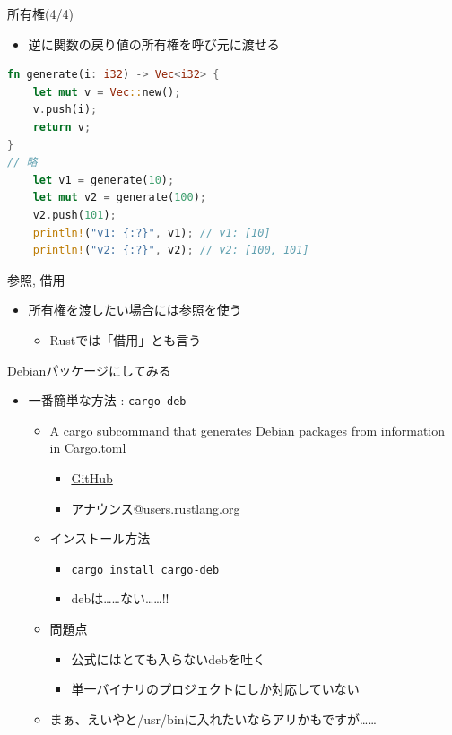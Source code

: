\documentclass[cjk,dvipdfmx,10pt,compress,fragile%
hyperref={bookmarks=true,bookmarksnumbered=true,bookmarksopen=false,%
colorlinks=false,%
pdftitle={第 134 回 関西 Debian 勉強会},%
pdfauthor={小林},%
pdfsubject={資料},%
}]{beamer}
\begin{document}
\begin{frame}[t,fragile]{所有権(4/4)}
\begin{itemize}
 \item 逆に関数の戻り値の所有権を呼び元に渡せる
\end{itemize}
 \begin{lstlisting}[language=Rust,style=boxed,style=colouredRust]
fn generate(i: i32) -> Vec<i32> {
    let mut v = Vec::new();
    v.push(i);
    return v;
}
// 略
    let v1 = generate(10);
    let mut v2 = generate(100);
    v2.push(101);
    println!("v1: {:?}", v1); // v1: [10]
    println!("v2: {:?}", v2); // v2: [100, 101]\end{lstlisting}
\end{frame}

\begin{frame}[t,fragile]{参照, 借用}
 \begin{itemize}
  \item 所有権を渡したい場合には参照を使う
	\begin{itemize}
	 \item Rustでは「借用」とも言う
	\end{itemize}
 \end{itemize}
\end{frame}


\begin{frame}[t,fragile]{Debianパッケージにしてみる}
 \begin{itemize}
  \item 一番簡単な方法 : \texttt{cargo-deb}
	\begin{itemize}
	 \item A cargo subcommand that generates Debian packages from information in Cargo.toml
	       \begin{itemize}
		\item \href{https://github.com/mmstick/cargo-deb}{GitHub}
		\item \href{https://users.rust-lang.org/t/cargo-deb-make-debian-packages-from-cargo-projects/12199}{アナウンス@users.rustlang.org}
	       \end{itemize}
	 \item インストール方法
	       \begin{itemize}
		\item \verb|cargo install cargo-deb|
		\item debは……ない……!!
	       \end{itemize}
	 \item 問題点
	       \begin{itemize}
		\item 公式にはとても入らないdebを吐く
		\item 単一バイナリのプロジェクトにしか対応していない
	       \end{itemize}
	 \item まぁ、えいやと/usr/binに入れたいならアリかもですが……
	\end{itemize}
 \end{itemize}
\end{frame}
\end{document}
